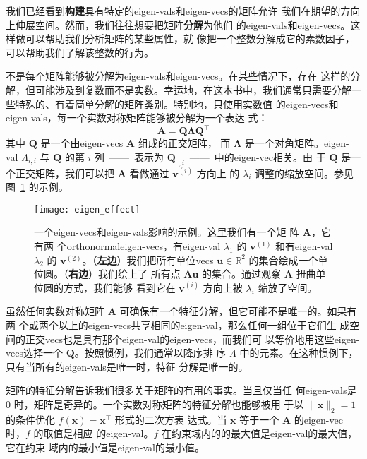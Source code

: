 我们已经看到\textbf{构建}具有特定的\gls*{eigen-vals}和\gls*{eigen-vecs}的矩阵允许
我们在期望的方向上伸展空间。然而，我们往往想要把矩阵\textbf{分解}为他们
的\gls*{eigen-vals}和\gls*{eigen-vecs}。这样做可以帮助我们分析矩阵的某些属性，就
像把一个整数分解成它的素数因子，可以帮助我们了解该整数的行为。

不是每个矩阵能够被分解为\gls*{eigen-vals}和\gls*{eigen-vecs}。在某些情况下，存在
这样的分解，但可能涉及到复数而不是实数。幸运地，在这本书中，我们通常只需要分解一
些特殊的、有着简单分解的矩阵类别。特别地，只使用实数值
的\gls*{eigen-vecs}和\gls*{eigen-vals}，每一个实数对称矩阵能够被分解为一个表达
式：
\begin{equation}
  \pmb{A} = \pmb{Q}\pmb{\Lambda}\pmb{Q}^{\top}
\end{equation}
其中 $\pmb{Q}$ 是一个由\gls*{eigen-vecs} $\pmb{A}$ 组成的正交矩阵，
而 $\pmb{\Lambda}$ 是一个对角矩阵。\gls*{eigen-val} $\Lambda_{i,i}$ 与 $\pmb{Q}$
的第 $i$ 列~——~表示为 $\pmb{Q}_{:,i}$~——~中的\gls*{eigen-vec}相关。由
于 $\pmb{Q}$ 是一个正交矩阵，我们可以把 $\pmb{A}$ 看做通过 $\pmb{v}^{(i)}$ 方向上
的 $\lambda_i$ 调整的缩放空间。参见
图~\ref{fig:effect_of_eigenvectors_and_eigenvalues} 的示例。

\begin{figure}[h]
  \centering
  \texttt{[image: eigen\_effect]}
  \caption{一个\gls*{eigen-vecs}和\gls*{eigen-vals}影响的示例。这里我们有一个矩
    阵 $\pmb{A}$，它有两
    个\gls*{orthonormal}\gls*{eigen-vecs}，有\gls*{eigen-val}
    $\lambda_1$ 的 $\pmb{v}^{(1)}$ 和有\gls*{eigen-val}
    $\lambda_2$ 的 $\pmb{v}^{(2)}$。（\textbf{左边}）我们把所有单位\gls*{vecs}
    $\pmb{u} \in \mathbb{R}^2$ 的集合绘成一个单位圆。（\textbf{右边}）我们绘上了
    所有点 $\pmb{A}\pmb{u}$ 的集合。通过观察 $\pmb{A}$ 扭曲单位圆的方式，我们能够
    看到它在 $\pmb{v}^{(i)}$ 方向上被 $\lambda_i$ 缩放了空间。
    \label{fig:effect_of_eigenvectors_and_eigenvalues}}
\end{figure}

虽然任何实数对称矩阵 $\pmb{A}$ 可确保有一个特征分解，但它可能不是唯一的。如果有两
个或两个以上的\gls*{eigen-vecs}共享相同的\gls*{eigen-val}，那么任何一组位于它们生
成空间的正交\gls*{vecs}也是具有那个\gls*{eigen-val}的\gls*{eigen-vecs}，而我们可
以等价地用这些\gls*{eigen-vecs}选择一个 $\pmb{Q}$。按照惯例，我们通常以降序排
序 $\Lambda$ 中的元素。在这种惯例下，只有当所有的\gls*{eigen-vals}是唯一时，特征
分解是唯一的。

矩阵的特征分解告诉我们很多关于矩阵的有用的事实。当且仅当任
何\gls*{eigen-vals}是 $0$ 时，矩阵是奇异的。一个实数对称矩阵的特征分解也能够被用
于以 $\|\pmb{x}\|_2 = 1$ 的条件优化 $f (\pmb{x}) = \pmb{x}^{\top}$ 形式的二次方表
达式。当 $\pmb{x}$ 等于一个 $\pmb{A}$ 的\gls*{eigen-vec}时，$f$ 的取值是相应
的\gls*{eigen-val}。$f$ 在约束域内的的最大值是\gls*{eigen-val}的最大值，它在约束
域内的最小值是\gls*{eigen-val}的最小值。

